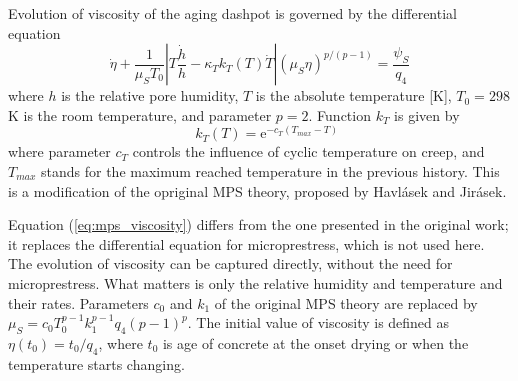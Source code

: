 \documentclass[a4paper]{article}
\begin{document}
Evolution of viscosity of the aging dashpot is governed by the differential
equation 
\begin{equation}
\label{eq:mps_viscosity}
\dot{\eta}+\frac{1}{\mu_S T_0} \left |  T \frac{\dot{h}}{h} - \kappa_T k_T(T) \dot{T}  \right | \left( \mu_S \eta \right)^{p/\left(p-1\right)} = \frac{\psi_S}{q_4}
\end{equation}
where $h$ is the relative pore humidity, $T$ is the absolute temperature [K], $T_0 = 298$ K is the room temperature,  and parameter $p = 2$. 
Function $k_T$ is given by 
\begin{equation}
\quad k_T(T) = \mbox{e}^{-c_T \left (T_{max}-T\right )}
\label{eq:mps_k_T}
\end{equation}
where parameter $c_T$ controls the influence of cyclic temperature on creep, and $T_{max}$ stands for the maximum reached temperature in the previous history. 
This is a modification of the opriginal MPS theory, proposed by Havl\'{a}sek and Jir\'{a}sek. 


Equation (\ref{eq:mps_viscosity}) differs from the one presented in the original work; it replaces the differential equation for microprestress, which is not used here. The evolution of viscosity can be captured directly, without the need for microprestress. What matters is only the relative humidity and temperature and their rates. Parameters $c_0$ and $k_1$ of the original MPS theory
are replaced by $\mu_S = c_0 T_0^{p-1} k_1^{p-1} q_4 (p-1)^p$. 
The initial value of viscosity is defined as $\eta(t_0) = t_0/q_4$, where $t_0$ is age of concrete at the onset drying or when the temperature starts changing.
\end{document}
